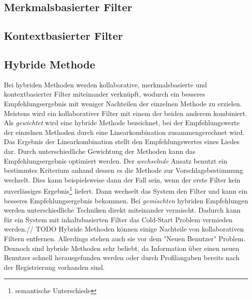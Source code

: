 \documentclass[twosided,a4,10pt]{article}
\begin{document}
\begin{multicols}{2}
		\subsection{Merkmalsbasierter Filter}
		\subsection{Kontextbasierter Filter}

				
		\subsection{Hybride Methode}
		Bei hybriden Methoden werden kollaborative, merkmalsbasierte und kontextbasierter Filter miteinander verknüpft, wodurch ein besseres Empfehlungsergebnis mit weniger Nachteilen der einzelnen Methode zu erzielen. Meistens wird ein kollaborativer Filter mit einem der beiden anderem kombiniert.\newline
		Als \textit{gewichtet} wird eine hybride Methode bezeichnet, bei der Empfehlungswerte der einzelnen Methoden durch eine Linearkombination zusammengerechnet wird. Das Ergebnis der Linearkombination stellt den Empfehlungswertes eines Liedes dar. Durch unterschiedliche Gewichtung der Methoden kann das Empfehlungsergebnis optimiert werden. Der \textit{wechselnde} Ansatz benutzt ein bestimmtes Kriterium anhand dessen es die Methode zur Vorschlagsbestimmung wechselt. Dies kann beispielsweise dann der Fall sein, wenn der erste Filter kein zuverlässiges Ergebnis\footnote[4]{semantische Unterschiede} liefert. Dann wechselt das System den Filter und kann ein besseres Empfehlungsergebnis bekommen. Bei \textit{gemischten} hybriden Empfehlungen werden unterschiedliche Techniken direkt miteinander vermischt. Dadurch kann für ein System mit inhaltsbasierten Filter das Cold-Start Problem vermieden werden.\newline // TODO
		Hybride Methoden können einige Nachteile von kollaborativen Filtern entfernen. Allerdings stehen auch sie vor dem "Neuen Benutzer" Problem. Dennoch sind hybride Methoden sehr beliebt, da Information über einen neuen Benutzer schnell herausgefunden werden oder durch Profilangaben bereits nach der Registrierung vorhanden sind. \cite{burke}
		

\end{multicols}
\end{document}
